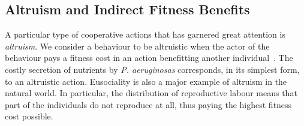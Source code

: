 
  \subsection{Altruism and Indirect Fitness Benefits}

    A particular type of cooperative actions that has garnered great attention is \emph{altruism}. We consider a behaviour to be altruistic when the actor of the behaviour pays a fitness cost in an action benefitting another individual~\parencite{Hamilton1964, West2007a}. The costly secretion of nutrients by \emph{P. aeruginosas} corresponds, in its simplest form, to an altruistic action. Eusociality is also a major example of altruism in the natural world. In particular, the distribution of reproductive labour means that part of the individuals do not reproduce at all, thus paying the highest fitness cost possible. 


